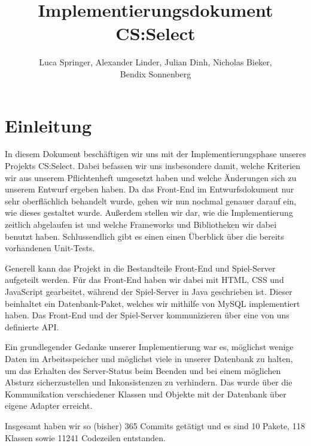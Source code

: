 \documentclass[a4paper]{scrreprt}
\begin{document}
\title{Implementierungsdokument CS:Select}
\author{Luca Springer, Alexander Linder, Julian Dinh, Nicholas Bieker,\\ Bendix Sonnenberg}
\maketitle

\tableofcontents


\chapter{Einleitung}

In diesem Dokument beschäftigen wir uns mit der Implementierungsphase unseres Projekts CS:Select. Dabei befassen wir uns insbesondere damit, welche Kriterien wir aus unserem Pflichtenheft umgesetzt haben und welche Änderungen sich zu unserem Entwurf ergeben haben. Da das Front-End im Entwurfsdokument nur sehr oberflächlich behandelt wurde, gehen wir nun nochmal genauer darauf ein, wie dieses gestaltet wurde. Außerdem stellen wir dar, wie die Implementierung zeitlich abgelaufen ist und welche Frameworks und Bibliotheken wir dabei benutzt haben. Schlussendlich gibt es einen einen Überblick über die bereits vorhandenen Unit-Tests.

\hspace{1cm}

Generell kann das Projekt in die Bestandteile Front-End und Spiel-Server aufgeteilt werden. Für das Front-End haben wir dabei mit HTML, CSS und JavaScript gearbeitet, während der Spiel-Server in Java geschrieben ist. Dieser beinhaltet ein Datenbank-Paket, welches wir mithilfe von MySQL implementiert haben. Das Front-End und der Spiel-Server kommunizieren über eine von uns definierte API.

\hspace{1cm}

Ein grundlegender Gedanke unserer Implementierung war es, möglichst wenige Daten im Arbeitsspeicher und möglichst viele in unserer Datenbank zu halten, um das Erhalten des Server-Status beim Beenden und bei einem möglichen Absturz sicherzustellen und Inkonsistenzen zu verhindern. Das wurde über die Kommunikation verschiedener Klassen und Objekte mit der Datenbank über eigene Adapter erreicht. 

\hspace{1cm}

Insgesamt haben wir so (bisher) 365 Commits getätigt und es sind 10 Pakete, 118 Klassen sowie 11241 Codezeilen entstanden. 
\end{document}
